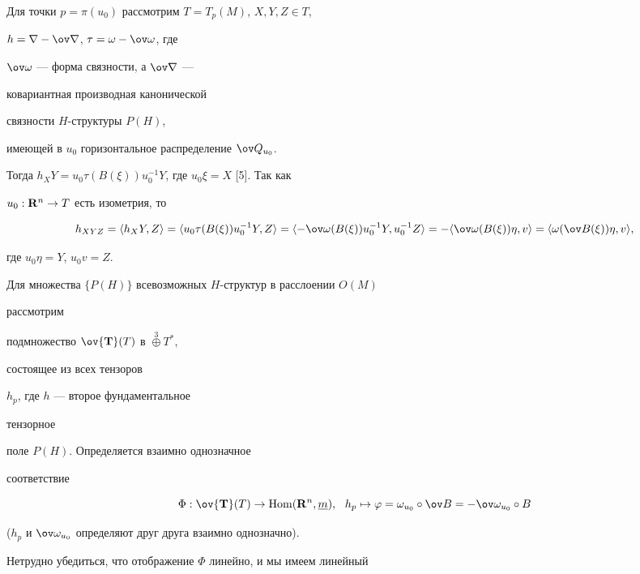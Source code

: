  


Для точки $p=\pi(u_0)$ рассмотрим $T=T_p(M)$, $X,Y,Z\in T$, 


$h=\nabla-\ov\nabla$, $\tau=\omega-\ov\omega$, где 


$\ov\omega$ --- форма связности, а $\ov\nabla$ ---


ковариантная производная канонической 


связности $H$-структуры $P(H)$, 


имеющей в $u_0$ горизонтальное распределение $\ov Q_{u_0}$. 


Тогда $h_X Y=u_0\tau(B(\xi))u^{-1}_0Y$, где $u_0\xi=X$ [5]. Так как 


$u_0:\bold R^n\to T$ есть изометрия, то 


$$ 


h_{X Y Z}=\la h_X Y,Z\ra=\la u_0\tau(B(\xi))u^{-1}_0Y,Z\ra= 


\la-\ov\omega(B(\xi))u^{-1}_0Y,u^{-1}_0Z\ra= 


-\la\ov\omega(B(\xi))\eta,v\ra= 


\la\omega(\ov B(\xi))\eta,v\ra, 


$$ 


где $u_0\eta=Y$, $u_0v=Z$. 


 


Для множества $\{P(H)\}$ всевозможных $H$-структур в расслоении $O(M)$ 


рассмотрим 


подмножество $\ov{\bold T}(T)$ в $\overset{3}{\oplus}{}T^*$,


состоящее из всех тензоров 


$h_p$, где $h$ --- второе фундаментальное 


тензорное 


поле $P(H)$. Определяется взаимно однозначное 


соответствие 


$$ 


\Phi:\ov{\bold T}(T)\to\Hom(\bold R^n,\ul m),


\ \ h_p\mapsto \varphi=\omega_{u_0}\circ\ov B= 


-\ov\omega_{u_0}\circ B 


$$ 


($h_p$ и $\ov\omega_{u_0}$ определяют друг друга взаимно однозначно). 


 


Нетрудно убедиться, что отображение $\Phi$ линейно, и мы имеем линейный 


